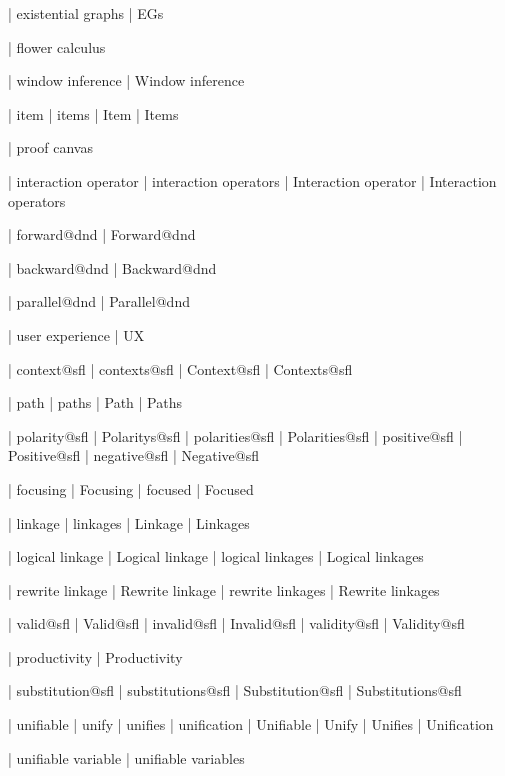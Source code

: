  | existential graphs
 | EGs

 | flower calculus
 
 | window inference
 | Window inference


 | item
 | items
 | Item
 | Items

 | proof canvas

 | interaction operator
 | interaction operators
 | Interaction operator
 | Interaction operators

 | forward@dnd
 | Forward@dnd

 | backward@dnd
 | Backward@dnd

 | parallel@dnd
 | Parallel@dnd


 | user experience
 | UX
 
 | context@sfl
 | contexts@sfl
 | Context@sfl
 | Contexts@sfl

 | path
 | paths
 | Path
 | Paths

 | polarity@sfl
 | Polaritys@sfl
 | polarities@sfl
 | Polarities@sfl
 | positive@sfl
 | Positive@sfl
 | negative@sfl
 | Negative@sfl

 | focusing
 | Focusing
 | focused
 | Focused

 | linkage
 | linkages
 | Linkage
 | Linkages

 | logical linkage
 | Logical linkage
 | logical linkages
 | Logical linkages

 | rewrite linkage
 | Rewrite linkage
 | rewrite linkages
 | Rewrite linkages

 | valid@sfl
 | Valid@sfl
 | invalid@sfl
 | Invalid@sfl
 | validity@sfl
 | Validity@sfl

 | productivity
 | Productivity
 
 | substitution@sfl
 | substitutions@sfl
 | Substitution@sfl
 | Substitutions@sfl

 | unifiable
 | unify
 | unifies
 | unification
 | Unifiable
 | Unify
 | Unifies
 | Unification

 | unifiable variable
 | unifiable variables

